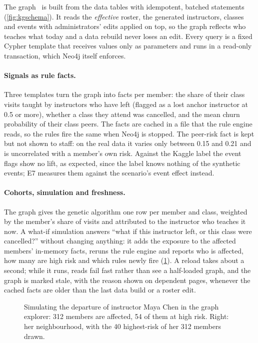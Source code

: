 The graph~\cite{hogan2021kg} is built from the data tables with idempotent, batched  statements (\cref{fig:kgschema}). It reads the \emph{effective} roster, the generated instructors, classes and events with administrators' edits applied on top, so the graph reflects who teaches what today and a data rebuild never loses an edit. Every query is a fixed Cypher template that receives values only as parameters and runs in a read-only transaction, which Neo4j itself enforces.

\paragraph{Signals as rule facts.} Three templates turn the graph into facts per member: the share of their class visits taught by instructors who have left (flagged as a lost anchor instructor at 0.5 or more), whether a class they attend was cancelled, and the mean churn probability of their class peers. The facts are cached in a file that the rule engine reads, so the rules fire the same when Neo4j is stopped. The peer-risk fact is kept but not shown to staff: on the real data it varies only between 0.15 and 0.21 and is uncorrelated with a member's own risk. Against the Kaggle label the event flags show no lift, as expected, since the label knows nothing of the synthetic events; E7 measures them against the scenario's event effect instead.

\paragraph{Cohorts, simulation and freshness.} The graph gives the genetic algorithm one row per member and class, weighted by the member's share of visits and attributed to the instructor who teaches it now. A what-if simulation answers \enquote{what if this instructor left, or this class were cancelled?} without changing anything: it adds the exposure to the affected members' in-memory facts, reruns the rule engine and reports who is affected, how many are high risk and which rules newly fire (\cref{fig:kgsim}). A reload takes about a second; while it runs, reads fail fast rather than see a half-loaded graph, and the graph is marked stale, with the reason shown on dependent pages, whenever the cached facts are older than the last data build or a roster edit.

\begin{figure}[tb]
  \centering
  \caption{Simulating the departure of instructor Maya Chen in the graph explorer: 312 members are affected, 54 of them at high risk. Right: her neighbourhood, with the 40 highest-risk of her 312 members drawn.}
  \label{fig:kgsim}
\end{figure}

